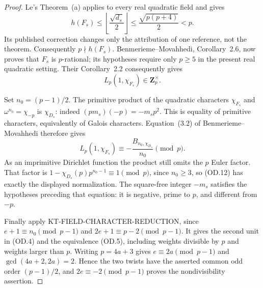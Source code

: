 \begin{proof}
Le's Theorem~(a) applies to every real quadratic field and gives
\[
 h(F_s)\leq\left\lfloor\frac{\sqrt{d_s}}2\right\rfloor
 \leq\frac{\sqrt{p(p+4)}}2<p.                            \tag{OD.10}
\]
Its published correction changes only the attribution of one
reference, not the theorem.  Consequently $p\nmid h(F_s)$.
Benmerieme--Movahhedi, Corollary~2.6, now proves that $F_s$ is
$p$-rational; its hypotheses require only $p\geq5$ in the present
real quadratic setting.  Their Corollary~2.2 consequently gives
\[
                    L_p(1,\chi_{F_s})\in\mathbf Z_p^\times.
                                                            \tag{OD.11}
\]

Set $n_0=(p-1)/2$.  The primitive product of the quadratic
characters $\chi_{F_s}$ and $\omega^{n_0}=\chi_{-p}$ is
$\chi_{D_s}$: indeed $(pm_s)(-p)=-m_sp^2$.
This is equality of primitive characters, equivalently of Galois
characters.  Equation~(3.2) of Benmerieme--Movahhedi therefore gives
\[
 L_p(1,\chi_{F_s})\equiv
       -\frac{B_{n_0,\chi_{D_s}}}{n_0}\pmod p.          \tag{OD.12}
\]
As an imprimitive Dirichlet function the product still omits the
$p$ Euler factor.  That factor is
$1-\chi_{D_s}(p)p^{n_0-1}\equiv1\pmod p$, since $n_0\geq3$,
so (OD.12) has exactly the displayed normalization.  The square-free
integer $-m_s$ satisfies the hypotheses preceding that equation:
it is negative, prime to $p$, and different from $-p$.

Finally apply KT-FIELD-CHARACTER-REDUCTION, since
$e+1\equiv n_0\pmod{p-1}$ and $2e+1\equiv p-2\pmod{p-1}$.
It gives the second unit in (OD.4) and the equivalence (OD.5),
including weights divisible by $p$ and weights larger than $p$.
Writing $p=4a+3$ gives $e\equiv2a\pmod{p-1}$ and
$\gcd(4a+2,2a)=2$.  Hence the two twists have the asserted common
odd order $(p-1)/2$, and $2e\equiv-2\pmod{p-1}$ proves the
nondivisibility assertion.
\end{proof}

